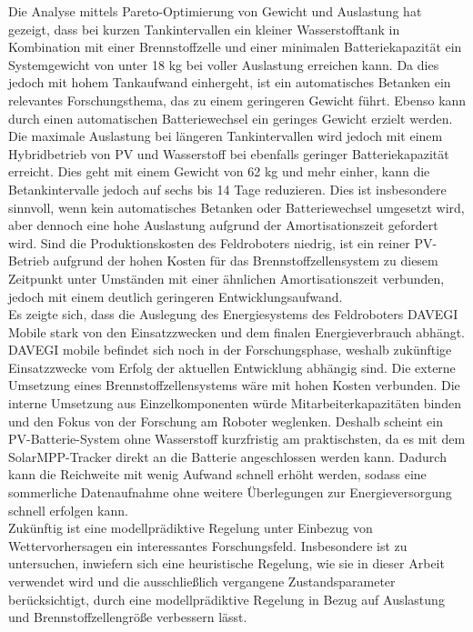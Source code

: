 Die Analyse mittels Pareto-Optimierung von Gewicht und Auslastung hat gezeigt, dass bei kurzen Tankintervallen ein kleiner Wasserstofftank in Kombination mit einer Brennstoffzelle und einer minimalen Batteriekapazität ein Systemgewicht von unter 18 kg bei voller Auslastung erreichen kann. Da dies jedoch mit hohem Tankaufwand einhergeht, ist ein automatisches Betanken ein relevantes Forschungsthema, das zu einem geringeren Gewicht führt. Ebenso kann durch einen automatischen Batteriewechsel ein geringes Gewicht erzielt werden. Die maximale Auslastung bei längeren Tankintervallen wird jedoch mit einem Hybridbetrieb von PV und Wasserstoff bei ebenfalls geringer Batteriekapazität erreicht. Dies geht mit einem Gewicht von 62 kg und mehr einher, kann die Betankintervalle jedoch auf sechs bis 14 Tage reduzieren. Dies ist insbesondere sinnvoll, wenn kein automatisches Betanken oder Batteriewechsel umgesetzt wird, aber dennoch eine hohe Auslastung aufgrund der Amortisationszeit gefordert wird. Sind die Produktionskosten des Feldroboters niedrig, ist ein reiner PV-Betrieb aufgrund der hohen Kosten für das Brennstoffzellensystem zu diesem Zeitpunkt unter Umständen mit einer ähnlichen Amortisationszeit verbunden, jedoch mit einem deutlich geringeren Entwicklungsaufwand. \\

Es zeigte sich, dass die Auslegung des Energiesystems des Feldroboters DAVEGI Mobile stark von den Einsatzzwecken und dem finalen Energieverbrauch abhängt. DAVEGI mobile befindet sich noch in der Forschungsphase, weshalb zukünftige Einsatzzwecke vom Erfolg der aktuellen Entwicklung abhängig sind. Die externe Umsetzung eines Brennstoffzellensystems wäre mit hohen Kosten verbunden. Die interne Umsetzung aus Einzelkomponenten würde Mitarbeiterkapazitäten binden und den Fokus von der Forschung am Roboter weglenken. Deshalb scheint ein PV-Batterie-System ohne Wasserstoff kurzfristig am praktischsten, da es mit dem SolarMPP-Tracker direkt an die Batterie angeschlossen werden kann. Dadurch kann die Reichweite mit wenig Aufwand schnell erhöht werden, sodass eine sommerliche Datenaufnahme ohne weitere Überlegungen zur Energieversorgung schnell erfolgen kann. \\

Zukünftig ist eine modellprädiktive Regelung unter Einbezug von Wettervorhersagen ein interessantes Forschungsfeld. Insbesondere ist zu untersuchen, inwiefern sich eine heuristische Regelung, wie sie in dieser Arbeit verwendet wird und die ausschließlich vergangene Zustandsparameter berücksichtigt, durch eine modellprädiktive Regelung in Bezug auf Auslastung und Brennstoffzellengröße verbessern lässt. \\

